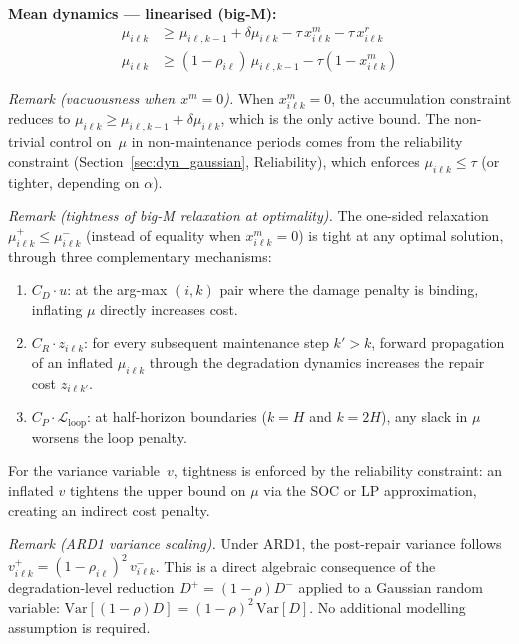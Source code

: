 \documentclass[11pt,a4paper]{article}
\begin{document}
\textbf{Mean dynamics --- linearised (big-M):}
\begin{align}
  \mu_{i\ell k} &\geq \mu_{i\ell,k-1} + \delta\mu_{i\ell k} - \tau\,x^m_{i\ell k}
    - \tau\,x^r_{i\ell k}
    \label{eq:g_ard_mu1} \\
  \mu_{i\ell k} &\geq (1-\rho_{i\ell})\,\mu_{i\ell,k-1} - \tau(1-x^m_{i\ell k})
    \label{eq:g_ard_mu2}
\end{align}

\emph{Remark (vacuousness when $x^m=0$).}
When $x^m_{i\ell k} = 0$, the accumulation constraint reduces to
$\mu_{i\ell k} \geq \mu_{i\ell,k-1} + \delta\mu_{i\ell k}$, which is the
only active bound. The non-trivial control on~$\mu$ in non-maintenance periods
comes from the reliability constraint (Section~\ref{sec:dyn_gaussian}, Reliability),
which enforces $\mu_{i\ell k} \leq \tau$ (or tighter, depending on $\alpha$).

\emph{Remark (tightness of big-M relaxation at optimality).}
The one-sided relaxation $\mu^+_{i\ell k} \leq \mu^-_{i\ell k}$ (instead of equality
when $x^m_{i\ell k}=0$) is tight at any optimal solution, through three complementary
mechanisms:
\begin{enumerate}[nosep]
  \item $C_D \cdot u$: at the arg-max $(i,k)$ pair where the damage penalty is binding,
        inflating $\mu$ directly increases cost.
  \item $C_R \cdot z_{i\ell k}$: for every subsequent maintenance step $k'>k$,
        forward propagation of an inflated $\mu_{i\ell k}$ through the degradation
        dynamics increases the repair cost $z_{i\ell k'}$.
  \item $C_P \cdot \mathcal{L}_{\mathrm{loop}}$: at half-horizon boundaries
        ($k=H$ and $k=2H$), any slack in $\mu$ worsens the loop penalty.
\end{enumerate}
For the variance variable~$v$, tightness is enforced by the reliability constraint:
an inflated $v$ tightens the upper bound on $\mu$ via the SOC or LP approximation,
creating an indirect cost penalty.

\emph{Remark (ARD1 variance scaling).}
Under ARD1, the post-repair variance follows
$v^+_{i\ell k} = (1-\rho_{i\ell})^2\,v^-_{i\ell k}$. This is a direct algebraic
consequence of the degradation-level reduction $D^+ = (1-\rho)D^-$ applied to a
Gaussian random variable: $\mathrm{Var}[(1-\rho)D] = (1-\rho)^2\,\mathrm{Var}[D]$.
No additional modelling assumption is required.
\end{document}

